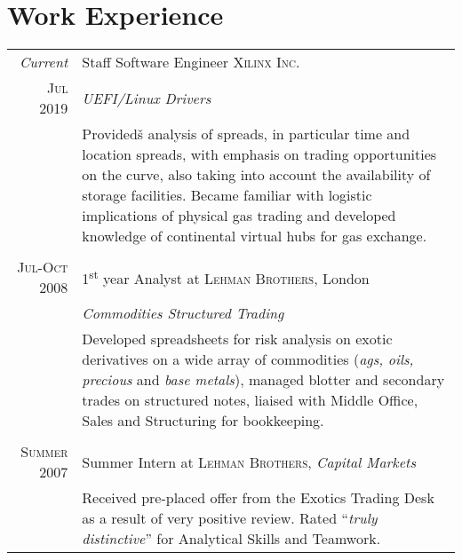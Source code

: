 \documentclass[a4paper,10pt]{article}
\begin{document}
\section{Work Experience}
\begin{tabular}{r|p{11cm}}
  \emph{Current}        & Staff Software Engineer \textsc{Xilinx Inc.}                                                                                                                                                                                                                                                                                                              \\
  \textsc{Jul 2019}     & \emph{UEFI/Linux Drivers}                                                                                                                                                                                                                                                                                                                                 \\
                        & \footnotesize{Provided\v{s} analysis of spreads, in particular time and location spreads, with emphasis on trading opportunities on the curve, also taking into account the availability of storage facilities. Became familiar with logistic implications of physical gas trading and developed knowledge of continental virtual hubs for gas exchange.} \\\multicolumn{2}{c}{} \\
  \textsc{Jul-Oct 2008} & 1\textsuperscript{st} year Analyst at \textsc{Lehman Brothers}, London                                                                                                                                                                                                                                                                                    \\&\emph{Commodities Structured Trading}\\&\footnotesize{Developed spreadsheets for risk analysis on exotic derivatives on a wide array of commodities (\textit{ags, oils, precious} and \textit{base metals}), managed blotter and secondary trades on structured notes, liaised with Middle Office, Sales and Structuring for bookkeeping.}\\\multicolumn{2}{c}{} \\
  \textsc{Summer 2007}  & Summer Intern at \textsc{Lehman Brothers}, \emph{Capital Markets}                                                                                                                                                                                                                                                                                         \\&\footnotesize{Received pre-placed offer from the Exotics Trading Desk as a result of very positive review. Rated ``\emph{truly distinctive}'' for Analytical Skills and Teamwork.}
\end{tabular}
\end{document}
